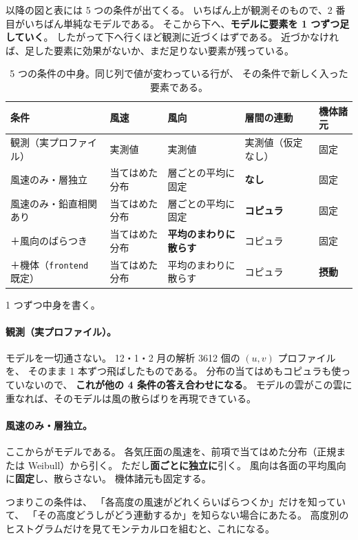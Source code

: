 以降の図と表には 5 つの条件が出てくる。
いちばん上が観測そのもので、2 番目がいちばん単純なモデルである。
そこから下へ、\textbf{モデルに要素を 1 つずつ足していく}。
したがって下へ行くほど観測に近づくはずである。
近づかなければ、足した要素に効果がないか、まだ足りない要素が残っている。

\begin{table}[H]
\centering
\caption{5 つの条件の中身。同じ列で値が変わっている行が、
その条件で新しく入った要素である。}
\label{tab:winter-scenarios}
\footnotesize
\begin{tabular}{@{}lllll@{}}
\toprule
条件 & 風速 & 風向 & 層間の連動 & 機体諸元 \\
\midrule
観測（実プロファイル）
  & 実測値
  & 実測値
  & 実測値（仮定なし）
  & 固定 \\
\addlinespace
風速のみ・層独立
  & 当てはめた分布
  & 層ごとの平均に固定
  & \textbf{なし}
  & 固定 \\
風速のみ・鉛直相関あり
  & 当てはめた分布
  & 層ごとの平均に固定
  & \textbf{コピュラ}
  & 固定 \\
＋風向のばらつき
  & 当てはめた分布
  & \textbf{平均のまわりに散らす}
  & コピュラ
  & 固定 \\
＋機体（\texttt{frontend} 既定）
  & 当てはめた分布
  & 平均のまわりに散らす
  & コピュラ
  & \textbf{摂動} \\
\bottomrule
\end{tabular}
\end{table}

1 つずつ中身を書く。

\paragraph{観測（実プロファイル）。}
モデルを一切通さない。
12・1・2 月の解析 \num{3612} 個の $(u, v)$ プロファイルを、
そのまま 1 本ずつ飛ばしたものである。
分布の当てはめもコピュラも使っていないので、
\textbf{これが他の 4 条件の答え合わせになる}。
モデルの雲がこの雲に重なれば、そのモデルは風の散らばりを再現できている。

\paragraph{風速のみ・層独立。}
ここからがモデルである。
各気圧面の風速を、前項で当てはめた分布（正規または Weibull）から引く。
ただし\textbf{面ごとに独立に}引く。
風向は各面の平均風向に\textbf{固定}し、散らさない。
機体諸元も固定する。

つまりこの条件は、
「各高度の風速がどれくらいばらつくか」だけを知っていて、
「その高度どうしがどう連動するか」を知らない場合にあたる。
高度別のヒストグラムだけを見てモンテカルロを組むと、これになる。

